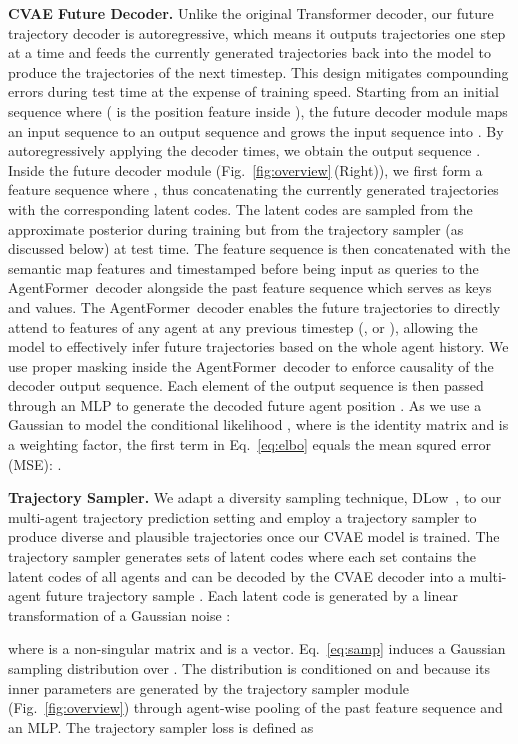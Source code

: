 \documentclass[10pt,twocolumn,letterpaper]{article}
\newcommand{\mname}{AgentFormer}
\begin{document}
\vspace{2mm}
\noindent\textbf{CVAE Future Decoder.}
Unlike the original Transformer decoder, our future trajectory decoder is autoregressive, which means it outputs trajectories one step at a time and feeds the currently generated trajectories back into the model to produce the trajectories of the next timestep. This design mitigates compounding errors during test time at the expense of training speed. Starting from an initial sequence  where  ( is the position feature inside ), the future decoder module maps an input sequence  to an output sequence  and grows the input sequence into . By autoregressively applying the decoder  times, we obtain the output sequence . Inside the future decoder module (Fig.~\ref{fig:overview}\,(Right)), we first form a feature sequence  where , thus concatenating the currently generated trajectories with the corresponding latent codes. The latent codes are sampled from the approximate posterior during training but from the trajectory sampler (as discussed below) at test time. The feature sequence  is then concatenated with the semantic map features and timestamped before being input as queries to the \mname\ decoder alongside the past feature sequence  which serves as keys and values. The \mname\ decoder enables the future trajectories to directly attend to features of any agent at any previous timestep (\eg,  or ), allowing the model to effectively infer future trajectories based on the whole agent history. We use proper masking inside the \mname\ decoder to enforce causality of the decoder output sequence. Each element of the output sequence is then passed through an MLP to generate the decoded future agent position . As we use a Gaussian to model the conditional likelihood , where  is the identity matrix and  is a weighting factor, the first term in Eq.~\eqref{eq:elbo} equals the mean squred error (MSE): .

\vspace{2mm}
\noindent\textbf{Trajectory Sampler.}
We adapt a diversity sampling technique, DLow~\cite{yuan2020dlow}, to our multi-agent trajectory prediction setting and employ a trajectory sampler to produce diverse and plausible trajectories once our CVAE model is trained. The trajectory sampler generates  sets of latent codes  where each set  contains the latent codes of all agents and can be decoded by the CVAE decoder into a multi-agent future trajectory sample . Each latent code  is generated by a linear transformation of a Gaussian noise :

where  is a non-singular matrix and  is a vector. Eq.~\eqref{eq:samp} induces a Gaussian sampling distribution  over . The distribution is conditioned on  and  because its inner parameters  are generated by the trajectory sampler module (Fig.~\ref{fig:overview}) through agent-wise pooling of the past feature sequence  and an MLP. The trajectory sampler loss is defined as
\end{document}
